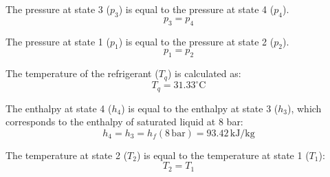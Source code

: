 The pressure at state 3 (\( p_3 \)) is equal to the pressure at state 4 (\( p_4 \)).  
\[
p_3 = p_4
\]  

The pressure at state 1 (\( p_1 \)) is equal to the pressure at state 2 (\( p_2 \)).  
\[
p_1 = p_2
\]  

The temperature of the refrigerant (\( T_q \)) is calculated as:  
\[
T_q = 31.33^\circ \text{C}
\]  

The enthalpy at state 4 (\( h_4 \)) is equal to the enthalpy at state 3 (\( h_3 \)), which corresponds to the enthalpy of saturated liquid at 8 bar:  
\[
h_4 = h_3 = h_f(8 \, \text{bar}) = 93.42 \, \text{kJ/kg}
\]  

The temperature at state 2 (\( T_2 \)) is equal to the temperature at state 1 (\( T_1 \)):  
\[
T_2 = T_1
\]